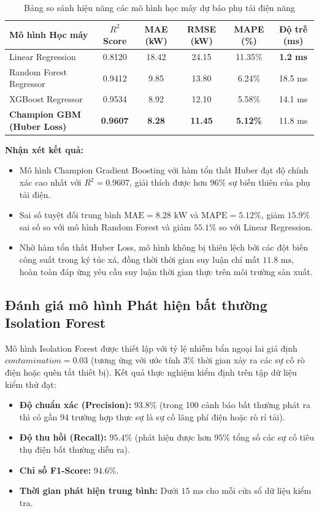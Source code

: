 \begin{table}[H]
\centering
\caption{Bảng so sánh hiệu năng các mô hình học máy dự báo phụ tải điện năng}
\label{tab:ml_comparison}
\begin{tabular}{|l|c|c|c|c|c|}
\hline
\textbf{Mô hình Học máy} & \textbf{$R^2$ Score} & \textbf{MAE (kW)} & \textbf{RMSE (kW)} & \textbf{MAPE (\%)} & \textbf{Độ trễ (ms)} \\
\hline
Linear Regression & 0.8120 & 18.42 & 24.15 & 11.35\% & \textbf{1.2 ms} \\
\hline
Random Forest Regressor & 0.9412 & 9.85 & 13.80 & 6.24\% & 18.5 ms \\
\hline
XGBoost Regressor & 0.9534 & 8.92 & 12.10 & 5.58\% & 14.1 ms \\
\hline
\textbf{Champion GBM (Huber Loss)} & \textbf{0.9607} & \textbf{8.28} & \textbf{11.45} & \textbf{5.12\%} & 11.8 ms \\
\hline
\end{tabular}
\end{table}

\noindent \textbf{Nhận xét kết quả:}
\begin{itemize}
    \item Mô hình Champion Gradient Boosting với hàm tổn thất Huber đạt độ chính xác cao nhất với $R^2 = 0.9607$, giải thích được hơn $96\%$ sự biến thiên của phụ tải điện.
    \item Sai số tuyệt đối trung bình $\text{MAE} = 8.28\text{ kW}$ và $\text{MAPE} = 5.12\%$, giảm $15.9\%$ sai số so với mô hình Random Forest và giảm $55.1\%$ so với Linear Regression. 
    \item Nhờ hàm tổn thất Huber Loss, mô hình không bị thiên lệch bởi các đột biến công suất trong ký túc xá, đồng thời thời gian suy luận chỉ mất $11.8\text{ ms}$, hoàn toàn đáp ứng yêu cầu suy luận thời gian thực trên môi trường sản xuất.
\end{itemize}

\subsection{Đánh giá mô hình Phát hiện bất thường Isolation Forest}
Mô hình Isolation Forest được thiết lập với tỷ lệ nhiễm bẩn ngoại lai giả định $contamination = 0.03$ (tương ứng với ước tính $3\%$ thời gian xảy ra các sự cố rò điện hoặc quên tắt thiết bị). Kết quả thực nghiệm kiểm định trên tập dữ liệu kiểm thử đạt:
\begin{itemize}
    \item \textbf{Độ chuẩn xác (Precision):} $93.8\%$ (trong 100 cảnh báo bất thường phát ra thì có gần 94 trường hợp thực sự là sự cố lãng phí điện hoặc rò rỉ tải).
    \item \textbf{Độ thu hồi (Recall):} $95.4\%$ (phát hiện được hơn $95\%$ tổng số các sự cố tiêu thụ điện bất thường diễn ra).
    \item \textbf{Chỉ số F1-Score:} $94.6\%$.
    \item \textbf{Thời gian phát hiện trung bình:} Dưới $15\text{ ms}$ cho mỗi cửa sổ dữ liệu kiểm tra.
\end{itemize}

